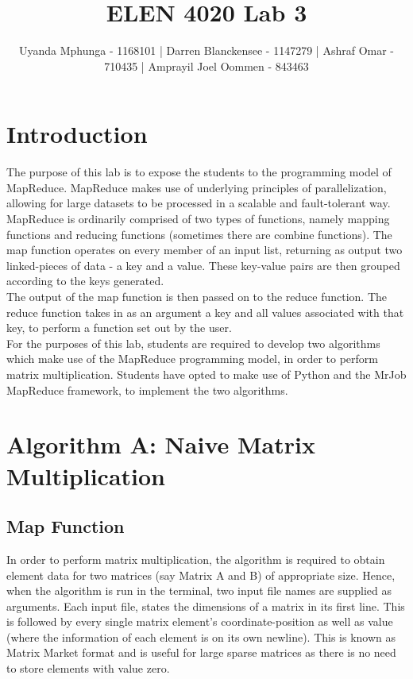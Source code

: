 \documentclass[journal, a4paper]{IEEEtran}
\begin{document}
	\title{ELEN 4020 Lab 3}

	\author{\small Uyanda Mphunga - 1168101 | Darren Blanckensee - 1147279 |
Ashraf Omar - 710435 | Amprayil Joel Oommen - 843463}

	\maketitle

\section{Introduction}
The purpose of this lab is to expose the students to the programming model of MapReduce. MapReduce makes use of underlying principles of parallelization, allowing for large datasets to be processed in a scalable and fault-tolerant way.\\

MapReduce is ordinarily comprised of two types of functions, namely mapping functions and reducing functions (sometimes there are combine functions). The map function operates on every member of an input list, returning as output two linked-pieces of data - a key and a value. These key-value pairs are then grouped according to the keys generated.\\

The output of the map function is then passed on to the reduce function. The reduce function takes in as an argument a key and all values associated with that key, to perform a function set out by the user.\\

For the purposes of this lab, students are required to develop two algorithms which make use of the MapReduce programming model, in order to perform matrix multiplication. Students have opted to make use of Python and the MrJob MapReduce framework, to implement the two algorithms. 

\section{Algorithm A: Naive Matrix Multiplication}
\subsection{Map Function}
\noindent
In order to perform matrix multiplication, the algorithm is required to obtain element data for two matrices (say Matrix A and B) of appropriate size. Hence, when the algorithm is run in the terminal, two input file names are supplied as arguments. Each input file, states the dimensions of a matrix in its first line. This is followed by every single matrix element's coordinate-position as well as value (where the information of each element is on its own newline). This is known as Matrix Market format and is useful for large sparse matrices as there is no need to store elements with value zero.
\end{document}
